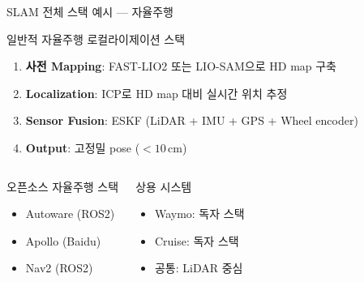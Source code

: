 \begin{frame}{SLAM 전체 스택 예시 — 자율주행}
  \begin{block}{일반적 자율주행 로컬라이제이션 스택}
    \begin{enumerate}
      \item \textbf{사전 Mapping}: FAST-LIO2 또는 LIO-SAM으로 HD map 구축
      \item \textbf{Localization}: ICP로 HD map 대비 실시간 위치 추정
      \item \textbf{Sensor Fusion}: ESKF (LiDAR + IMU + GPS + Wheel encoder)
      \item \textbf{Output}: 고정밀 pose ($<10\,$cm)
    \end{enumerate}
  \end{block}
  \pause
  \begin{columns}
    \begin{block}{오픈소스 자율주행 스택}
      \begin{itemize}
        \item Autoware (ROS2)
        \item Apollo (Baidu)
        \item Nav2 (ROS2)
      \end{itemize}
    \end{block}
    \begin{block}{상용 시스템}
      \begin{itemize}
        \item Waymo: 독자 스택
        \item Cruise: 독자 스택
        \item 공통: LiDAR 중심
      \end{itemize}
    \end{block}
  \end{columns}
\end{frame}


